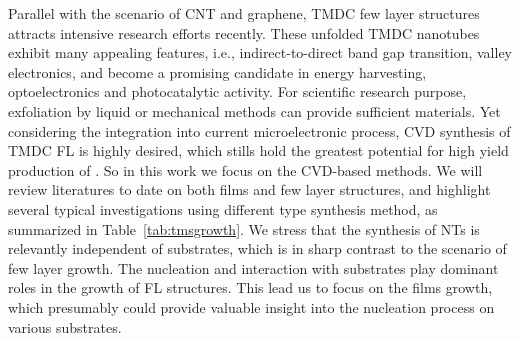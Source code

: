 Parallel with the scenario of CNT and graphene, TMDC few layer structures attracts intensive research efforts recently. These unfolded TMDC nanotubes exhibit many appealing features, i.e., indirect-to-direct band gap transition,\cite{Splendiani2010} valley electronics, and become a promising candidate in energy harvesting, optoelectronics and photocatalytic activity. For scientific research purpose, exfoliation by liquid \cite{Smith2011} or mechanical methods \cite{Lee2010a} can provide sufficient materials. Yet considering the integration into current microelectronic process, CVD synthesis of TMDC FL is highly desired, which stills hold the greatest potential for high yield production of . So in this work we focus on the CVD-based methods. We will review literatures to date on both  films and few layer structures, and highlight several typical investigations using different type synthesis method, as summarized in Table~\ref{tab:tmsgrowth}. We stress that the synthesis of NTs is relevantly independent of substrates, which is in sharp contrast to the scenario of few layer growth. The  nucleation and interaction with substrates play dominant roles in the growth of FL structures. This lead us to focus on the  films growth, which presumably could provide valuable insight into the nucleation process on various substrates.

